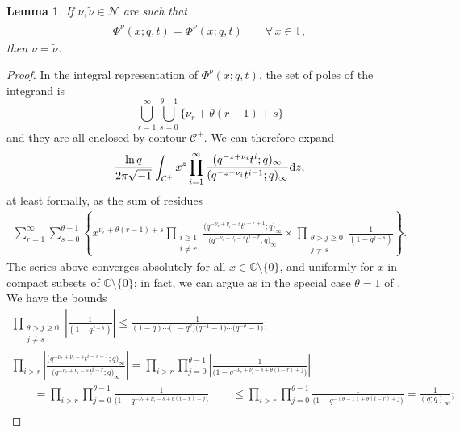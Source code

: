 \documentclass[pdftex]{sigma}
\numberwithin{equation}{section}
\newtheorem{lem}[thm]{Lemma}
\newcommand{\C}{\mathbb{C}}
\newcommand{\CC}{\mathcal{C}}
\newcommand{\Nu}{\mathcal{N}}
\newcommand{\TT}{\mathbb{T}}
\begin{document}
\begin{lem}\label{lem:expansionintegrals}
If $\nu, \widetilde{\nu} \in\Nu$ are such that
\begin{gather}\label{eqn:phiinjective}
\Phi^{\nu}(x; q, t) = \Phi^{\widetilde{\nu}}(x; q, t) \qquad \forall \, x \in \TT,
\end{gather}
then $\nu = \widetilde{\nu}$.
\end{lem}
\begin{proof}
In the integral representation of $\Phi^{\nu}(x; q, t)$, the set of poles of the integrand is
\[
\bigcup_{r=1}^{\infty}\bigcup_{s=0}^{\theta-1}{\{\nu_r + \theta(r-1) + s\}}
\]
and they are all enclosed by contour $\CC^+$. We can therefore expand
\begin{gather*}
\frac{\ln{q}}{2\pi\sqrt{-1}}\int_{\CC^+}{x^z\prod_{i=1}^{\infty}{\frac{(q^{-z+\nu_i}t^i; q)_{\infty}}{(q^{-z+\nu_i}t^{i-1}; q)_{\infty}}}{\rm d}z},
\end{gather*}
at least formally, as the sum of residues
\begin{gather}\label{eq:sumresidues}
\sum_{r=1}^{\infty}\sum_{s=0}^{\theta-1}
\left\{ x^{\nu_r + \theta(r-1) + s} \prod_{\substack{i\geq 1 \\ i \neq r}}{\frac{\big(q^{-\nu_r+\nu_i-s}t^{i-r+1}; q\big)_{\infty}}{\big(q^{-\nu_r + \nu_i - s}t^{i-r}; q\big)_{\infty}}} \times \prod_{\substack{\theta > j \geq 0 \\ j \neq s}}{\frac{1}{(1 - q^{j-s})}} \right\}.
\end{gather}
The series above converges absolutely for all $x\in\C\setminus\{0\}$, and uniformly for $x$ in compact subsets of $\C\setminus\{0\}$; in fact, we can argue as in the special case $\theta = 1$ of \cite[Section~6.2]{GP}. We have the bounds
\begin{gather*}
\prod_{\substack{\theta > j \geq 0 \\ j \neq s}}{ \left| \frac{1}{(1 - q^{j-s})} \right| }
\leq \frac{1}{(1 - q)\cdots \big(1 - q^{\theta}\big)\big(q^{-1} - 1\big)\cdots \big(q^{-\theta} - 1\big)};\\
\prod_{i > r}{\left| \frac{\big(q^{-\nu_r+\nu_i-s}t^{i-r+1}; q\big)_{\infty}}{\big(q^{-\nu_r + \nu_i - s}t^{i-r}; q\big)_{\infty}} \right|} =
\prod_{i > r} \prod_{j = 0}^{\theta - 1} {\left| \frac{1}{\big(1 - q^{-\nu_r + \nu_i - s + \theta(i - r)+j}\big)} \right|}\\
\qquad {} = \prod_{i > r} \prod_{j = 0}^{\theta - 1} { \frac{1}{\big(1 - q^{-\nu_r + \nu_i - s + \theta(i - r)+j}\big)} }
\qquad{} \leq \prod_{i > r} \prod_{j = 0}^{\theta - 1} { \frac{1}{\big(1 - q^{- (\theta-1) + \theta(i - r)+j}\big)} } = \frac{1}{(q; q)_{\infty}};\\

\end{gather*}
\end{proof}
\end{document}
